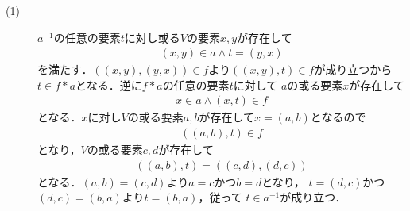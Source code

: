 	\begin{prf}\mbox{}
		\begin{description}
			\item[(1)] $a^{-1}$の任意の要素$t$に対し或る$V$の要素$x,y$が存在して
				\begin{align}
					(x,y) \in a \wedge t = (y,x)
				\end{align}
				を満たす．$((x,y),(y,x)) \in f$より$((x,y),t) \in f$が成り立つから
				$t \in f \ast a$となる．逆に$f \ast a$の任意の要素$t$に対して
				$a$の或る要素$x$が存在して
				\begin{align}
					x \in a \wedge (x,t) \in f
				\end{align}
				となる．$x$に対し$V$の或る要素$a,b$が存在して$x=(a,b)$となるので
				\begin{align}
					((a,b),t) \in f
				\end{align}
				となり，$V$の或る要素$c,d$が存在して
				\begin{align}
					((a,b),t) = ((c,d),(d,c))
				\end{align}
				となる．$(a,b) = (c,d)$より$a=c$かつ$b=d$となり，
				$t = (d,c)$かつ$(d,c)=(b,a)$より$t=(b,a)$，従って
				$t \in a^{-1}$が成り立つ．
		\end{description}
	\end{prf}
